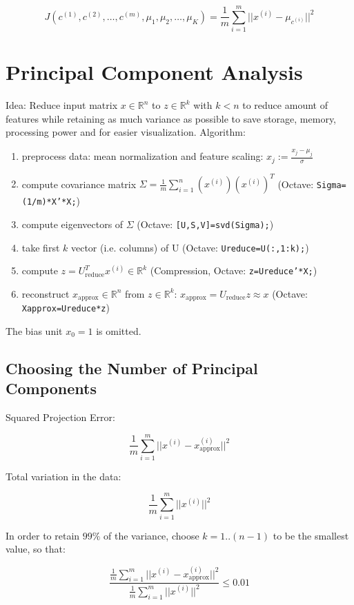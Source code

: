 \documentclass[a4paper,11pt]{scrartcl}
\begin{document}
$$ J(c^{(1)},c^{(2)},\dots,c^{(m)},\mu_1,\mu_2,\dots,\mu_K) = \frac{1}{m} \sum_{i=1}^{m} || x^{(i)} - \mu_{c^{(i)}} ||^2 $$

\section{Principal Component Analysis}

Idea: Reduce input matrix $x \in \mathbb{R}^{n}$ to $z \in \mathbb{R}^{k}$ with $k<n$ to reduce amount of features while retaining as much variance as possible to save storage, memory, processing power and for easier visualization. Algorithm:

\begin{enumerate}
    \item preprocess data: mean normalization and feature scaling: $x_j := \frac{x_j - \mu_j}{\sigma}$
    \item compute covariance matrix $\Sigma=\frac{1}{m} \sum_{i=1}^{n} (x^{(i)})(x^{(i)})^T$ (Octave: \texttt{Sigma=(1/m)*X'*X;})
    \item compute eigenvectors of $\Sigma$ (Octave: \texttt{[U,S,V]=svd(Sigma);})
    \item take first $k$ vector (i.e. columns) of U (Octave: \texttt{Ureduce=U(:,1:k);})
    \item compute $z=U_{\text{reduce}}^T x^{(i)} \in \mathbb{R}^k$ (Compression, Octave: \texttt{z=Ureduce'*X;})
    \item reconstruct $x_{\text{approx}} \in \mathbb{R}^n$ from $z \in \mathbb{R}^k$: $x_{\text{approx}} = U_{\text{reduce}} z \approx x$ (Octave: \texttt{Xapprox=Ureduce*z})
\end{enumerate}

The bias unit $x_0=1$ is omitted.

\subsection{Choosing the Number of Principal Components}

Squared Projection Error:

$$ \frac{1}{m} \sum_{i=1}^{m} || x^{(i)} - x^{(i)}_{\text{approx}} ||^2 $$

Total variation in the data:

$$ \frac{1}{m} \sum_{i=1}^{m} || x^{(i)} ||^2 $$

In order to retain $99\%$ of the variance, choose $k = 1..(n-1)$ to be the smallest value, so that:

$$ \frac{ \frac{1}{m} \sum_{i=1}^{m} || x^{(i)} - x^{(i)}_{\text{approx}} ||^2}{ { \frac{1}{m}} \sum_{i=1}^{m} || x^{(i)} ||^2} \leq 0.01$$
\end{document}
